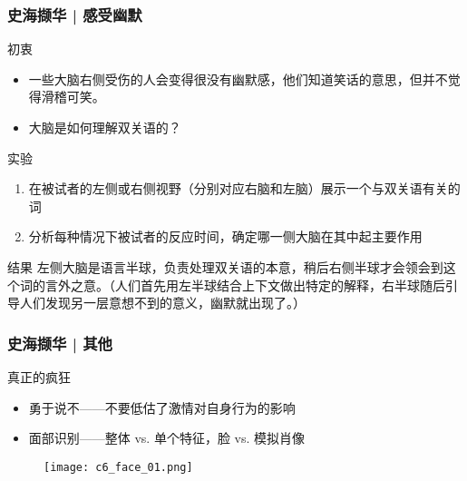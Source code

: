 \begin{frame}
  \frametitle{史海撷华 | 感受幽默}
  \begin{block}{初衷}
    \begin{itemize}
      \item 一些大脑右侧受伤的人会变得很没有幽默感，他们知道笑话的意思，但并不觉得滑稽可笑。
      \item 大脑是如何理解双关语的？
    \end{itemize}
  \end{block}
  \vspace{-0.5em}
  \pause
  \begin{block}{实验}
    \begin{enumerate}
      \item 在被试者的左侧或右侧视野（分别对应右脑和左脑）展示一个与双关语有关的词
      \item 分析每种情况下被试者的反应时间，确定哪一侧大脑在其中起主要作用
    \end{enumerate}
  \end{block}
  \vspace{-0.5em}
  \pause
  \begin{block}{\alert{结果}}
左侧大脑是语言半球，负责处理双关语的本意，稍后右侧半球才会领会到这个词的言外之意。（人们首先用左半球结合上下文做出特定的解释，右半球随后引导人们发现另一层意想不到的意义，幽默就出现了。）
  \end{block}
\end{frame}

\begin{frame}
  \frametitle{史海撷华 | 其他}
  \begin{block}{真正的疯狂}
  \begin{itemize}
    \item 勇于说不——不要低估了激情对自身行为的影响
    \item 面部识别——整体 vs. 单个特征，脸 vs. 模拟肖像
  \end{itemize}
  \vspace{-1em}
  \begin{figure}
    \centering
    \texttt{[image: c6\_face\_01.png]}
  \end{figure}
  \end{block}
\end{frame}



